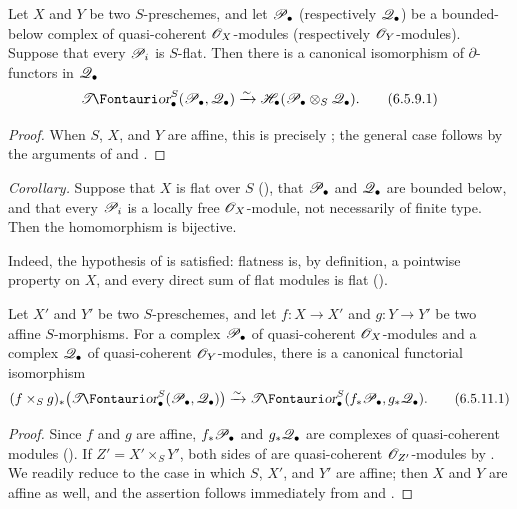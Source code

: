 \begin{corollary}[6.5.9]
\label{III.6.5.9}
Let $X$ and $Y$ be two $S$-preschemes, and let
$\mathscr{P}_\bullet$ (respectively $\mathscr{Q}_\bullet$) be a
bounded-below complex of quasi-coherent $\mathscr{O}_X$-modules
(respectively $\mathscr{O}_Y$-modules).  Suppose that every
$\mathscr{P}_i$ is $S$-flat.  Then there is a canonical isomorphism of
$\partial$-functors in $\mathscr{Q}_\bullet$
\[
  \shTor_\bullet^S(\sh P_\bullet,\sh Q_\bullet)
  \xrightarrow{\sim}
  \sh H_\bullet(\sh P_\bullet\otimes_S\sh Q_\bullet).
  \tag{6.5.9.1}\label{III.6.5.9.1}
\]
\end{corollary}

\begin{proof}
When $S$, $X$, and $Y$ are affine, this is precisely
; the general case follows by the arguments of
 and .
\end{proof}

\begin{env}[6.5.10]
\label{III.6.5.10}
\emph{Corollary.}
Suppose that $X$ is flat over $S$ (), that
$\mathscr{P}_\bullet$ and $\mathscr{Q}_\bullet$ are bounded below, and that
every $\mathscr{P}_i$ is a locally free $\mathscr{O}_X$-module, not
necessarily of finite type.  Then the homomorphism
 is bijective.

Indeed, the hypothesis of  is satisfied:
flatness is, by definition, a pointwise property on $X$, and
every direct sum of flat modules is flat ().
\end{env}

\begin{proposition}[6.5.11]
\label{III.6.5.11}
Let $X'$ and $Y'$ be two $S$-preschemes, and let
$f:X\to X'$ and $g:Y\to Y'$ be two affine $S$-morphisms.  For a
complex $\mathscr{P}_\bullet$ of quasi-coherent $\mathscr{O}_X$-modules and
a complex $\mathscr{Q}_\bullet$ of quasi-coherent $\mathscr{O}_Y$-modules,
there is a canonical functorial isomorphism
\[
  (f\times_Sg)_*
  \bigl(\shTor_\bullet^S(\sh P_\bullet,\sh Q_\bullet)\bigr)
  \xrightarrow{\sim}
  \shTor_\bullet^S(f_*\sh P_\bullet,g_*\sh Q_\bullet).
  \tag{6.5.11.1}\label{III.6.5.11.1}
\]
\end{proposition}

\begin{proof}
Since $f$ and $g$ are affine, $f_*\mathscr{P}_\bullet$ and
$g_*\mathscr{Q}_\bullet$ are complexes of quasi-coherent modules
().  If $Z'=X'\times_SY'$, both sides of
 are quasi-coherent $\mathscr{O}_{Z'}$-modules by
.  We readily reduce to the case in which $S$,
$X'$, and $Y'$ are affine; then $X$ and $Y$ are affine as well,
and the assertion follows immediately from
 and .
\end{proof}

